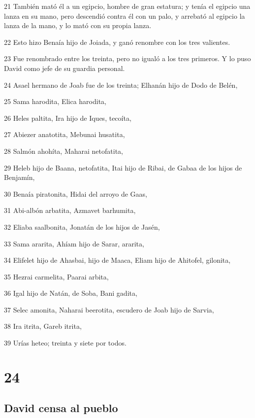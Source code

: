 \par 21 También mató él a un egipcio, hombre de gran estatura; y tenía el egipcio una lanza en su mano, pero descendió contra él con un palo, y arrebató al egipcio la lanza de la mano, y lo mató con su propia lanza.
\par 22 Esto hizo Benaía hijo de Joiada, y ganó renombre con los tres valientes.
\par 23 Fue renombrado entre los treinta, pero no igualó a los tres primeros. Y lo puso David como jefe de su guardia personal. 
\par 24 Asael hermano de Joab fue de los treinta; Elhanán hijo de Dodo de Belén,
\par 25 Sama harodita, Elica harodita,
\par 26 Heles paltita, Ira hijo de Iques, tecoíta,
\par 27 Abiezer anatotita, Mebunai husatita,
\par 28 Salmón ahohíta, Maharai netofatita,
\par 29 Heleb hijo de Baana, netofatita, Itai hijo de Ribai, de Gabaa de los hijos de Benjamín,
\par 30 Benaía piratonita, Hidai del arroyo de Gaas,
\par 31 Abi-albón arbatita, Azmavet barhumita,
\par 32 Eliaba saalbonita, Jonatán de los hijos de Jasén,
\par 33 Sama ararita, Ahíam hijo de Sarar, ararita, 
\par 34 Elifelet hijo de Ahasbai, hijo de Maaca, Eliam hijo de Ahitofel, gilonita,
\par 35 Hezrai carmelita, Paarai arbita,
\par 36 Igal hijo de Natán, de Soba, Bani gadita,
\par 37 Selec amonita, Naharai beerotita, escudero de Joab hijo de Sarvia,
\par 38 Ira itrita, Gareb itrita,
\par 39 Urías heteo; treinta y siete por todos.

\chapter{24}

\section*{David censa al pueblo}

